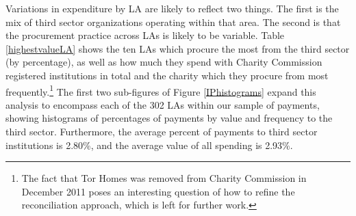 \documentclass[12pt]{article}
\begin{document}
Variations in expenditure by LA are likely to reflect two things. The first is the mix of third sector organizations operating within that area. The second is that the procurement practice across LAs is likely to be variable. Table \ref{highestvalueLA} shows the ten LAs which procure the  most from the third sector (by percentage), as well as how much they spend with Charity Commission registered institutions in total and the charity which they procure from most frequently.\footnote{The fact that Tor Homes was removed from Charity Commission in December 2011 poses an interesting question of how to refine the reconciliation approach, which is left for further work.} The first two sub-figures of Figure \ref{IPhistograms} expand this analysis to encompass each of the 302 LAs within our sample of payments, showing histograms of percentages of payments by value and frequency to the third sector. Furthermore, the average percent of payments to third sector institutions is 2.80\%, and the average value of all spending is 2.93\%.
\end{document}
